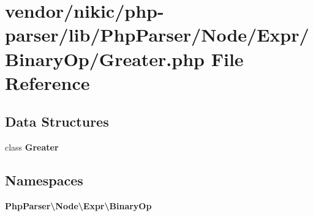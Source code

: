 \section{vendor/nikic/php-\/parser/lib/\+Php\+Parser/\+Node/\+Expr/\+Binary\+Op/\+Greater.php File Reference}
\label{_greater_8php}
\subsection*{Data Structures}
\begin{DoxyCompactItemize}
\item 
class {\bf Greater}
\end{DoxyCompactItemize}
\subsection*{Namespaces}
\begin{DoxyCompactItemize}
\item 
 {\bf Php\+Parser\textbackslash{}\+Node\textbackslash{}\+Expr\textbackslash{}\+Binary\+Op}
\end{DoxyCompactItemize}
